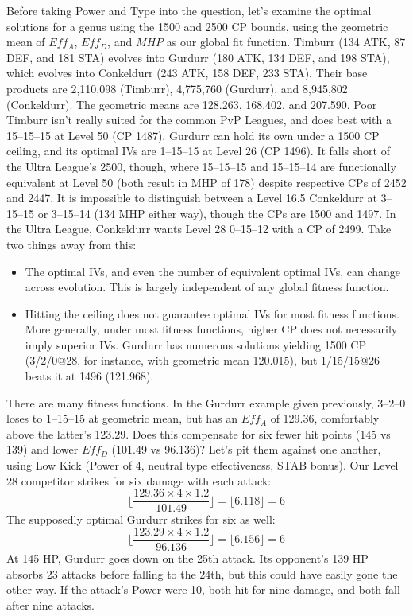 Before taking Power and Type into the question, let's examine the optimal
 solutions for a genus using the 1500 and 2500 CP bounds, using the
 geometric mean of $Eff_A$, $Eff_D$, and $MHP$ as our global fit function.
Timburr (134 ATK, 87 DEF, and 181 STA) evolves into
  Gurdurr (180 ATK, 134 DEF, and 198 STA), which evolves into
  Conkeldurr (243 ATK, 158 DEF, 233 STA).
Their base products are 2,110,098 (Timburr), 4,775,760 (Gurdurr),
  and 8,945,802 (Conkeldurr).
The geometric means are 128.263, 168.402, and 207.590.
Poor Timburr isn't really suited for the common PvP Leagues,
  and does best with a 15--15--15 at Level 50 (CP 1487).
Gurdurr can hold its own under a 1500 CP ceiling, and its
  optimal IVs are 1--15--15 at Level 26 (CP 1496).
It falls short of the Ultra League's 2500, though, where
  15--15--15 and 15--15--14 are functionally equivalent
  at Level 50 (both result in MHP of 178) despite
  respective CPs of 2452 and 2447.
It is impossible to distinguish between a Level 16.5 Conkeldurr at
  3--15--15 or 3--15--14 (134 MHP either way), though
  the CPs are 1500 and 1497.
In the Ultra League, Conkeldurr wants Level 28 0--15--12 with
  a CP of 2499.
Take two things away from this:
\begin{itemize}
\item The optimal IVs, and even the number of equivalent optimal IVs, can change across evolution.
  This is largely independent of any global fitness function.
\item Hitting the ceiling does not guarantee optimal IVs for most fitness functions.
  More generally, under most fitness functions, higher CP does not necessarily imply superior IVs.
    Gurdurr has numerous solutions yielding 1500 CP (3/2/0@28, for instance, with geometric
    mean 120.015), but 1/15/15@26 beats it at 1496 (121.968).
\end{itemize}
There are many fitness functions. In the Gurdurr example given previously, 3--2--0 loses
    to 1--15--15 at geometric mean, but has an $Eff_A$ of 129.36, comfortably above the latter's 123.29.
 Does this compensate for six fewer hit points (145 vs 139) and lower $Eff_D$ (101.49 vs 96.136)?
 Let's pit them against one another, using Low Kick (Power of 4, neutral type effectiveness, STAB bonus).
 Our Level 28 competitor strikes for six damage with each attack:
    \[ \lfloor \frac{129.36 \times 4 \times 1.2}{101.49} \rfloor = \lfloor 6.118 \rfloor = 6 \]
 The supposedly optimal Gurdurr strikes for six as well:
    \[ \lfloor \frac{123.29 \times 4 \times 1.2}{96.136} \rfloor = \lfloor 6.156 \rfloor = 6 \]
 At 145 HP, Gurdurr goes down on the 25th attack.
 Its opponent's 139 HP absorbs 23 attacks before falling to the 24th, but this could
    have easily gone the other way.
 If the attack's Power were 10, both hit for nine damage, and both fall after nine attacks.

